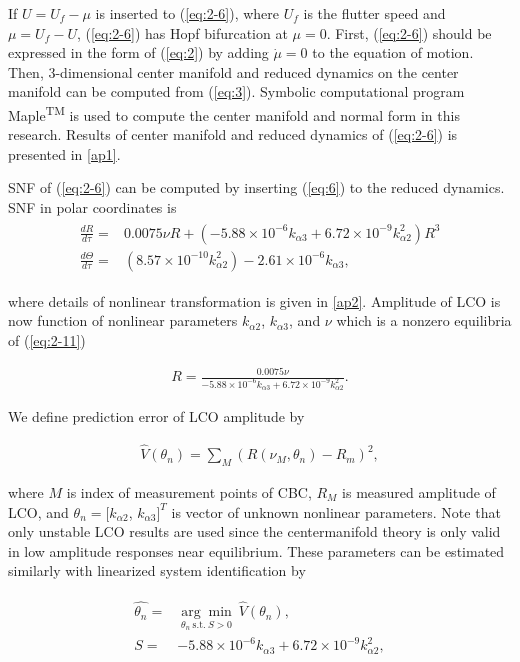 \documentclass[openacc]{rsproca_new}%
\newcommand{\Eref}[1]{(\ref{#1})}
\begin{document}
If $U=U_f-\mu$ is inserted to \Eref{eq:2-6}, where $U_f$ is the flutter speed and $\mu=U_f-U$, \Eref{eq:2-6} has Hopf bifurcation at $\mu=0$. First, \Eref{eq:2-6} should be expressed in the form of \Eref{eq:2} by adding $\dot \mu=0$ to the equation of motion. Then, 3-dimensional center manifold and reduced dynamics on the center manifold can be computed from \Eref{eq:3}. Symbolic computational program Maple\textsuperscript{TM} \cite{char1986tutorial} is used to compute the center manifold and normal form in this research. Results of center manifold and reduced dynamics of \Eref{eq:2-6} is presented in \ref{ap1}.

SNF of \Eref{eq:2-6} can be computed by inserting \Eref{eq:6} to the reduced dynamics. SNF in polar coordinates is
\begin{align}\label{eq:2-11}
\begin{split}
\frac{dR}{d\tau}=&0.0075\nu R+(- 5.88 \times 10^{-6}  k_{\alpha 3} + 6.72 \times 10^{-9} k_{\alpha 2}^2)R^3\\
\frac{d\Theta}{d\tau}=&(8.57 \times 10^{-10}  k_{\alpha 2}^2) - 2.61 \times 10^{-6}k_{\alpha 3},
\end{split}
\end{align}

\noindent where details of nonlinear transformation is given in \ref{ap2}. Amplitude of LCO is now function of nonlinear parameters $k_{\alpha2}$, $k_{\alpha3}$, and $\nu$ which is a nonzero equilibria of \Eref{eq:2-11}

\begin{align}\label{eq:2-12}
R=\frac{0.0075\nu}{- 5.88 \times 10^{-6}  k_{\alpha 3} + 6.72 \times 10^{-9} k_{\alpha 2}^2}.
\end{align}

\noindent We define prediction error of LCO amplitude by

\begin{align}\label{eq:2-13}
\hat{V}(\theta_n)=\sum_M (R(\nu_M,\theta_n)-R_m)^2,
\end{align}

\noindent where $M$ is index of measurement points of CBC, $R_M$ is measured amplitude of LCO, and $\theta_n=[k_{\alpha2}$, $k_{\alpha3}]^T$ is vector of unknown nonlinear parameters. Note that only unstable LCO results are used since the centermanifold theory is only valid in low amplitude responses near equilibrium. These parameters can be estimated similarly with linearized system identification by

\begin{align}\label{eq:2-14}
\begin{split}
\hat{\theta_n}=&\underset{\theta_n \: \textrm{s.t.} \: S>0} {\arg\min} \: \hat V(\theta_n),\\
S=&- 5.88 \times 10^{-6}  k_{\alpha 3} + 6.72 \times 10^{-9} k_{\alpha 2}^2,
\end{split}
\end{align}
\end{document}
